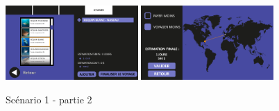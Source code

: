 \documentclass{article}
\begin{document}
\begin{figure}[!h]
	\includegraphics[width=0.45\textwidth]{assets/prototype/haute/Diapositive15}
	\hfill
	\includegraphics[width=0.45\textwidth]{assets/prototype/haute/Diapositive16}
	\caption{Scénario 1 - partie 2}
	\label{Scenario 1 - partie 2}
\end{figure}
\newpage
\end{document}
